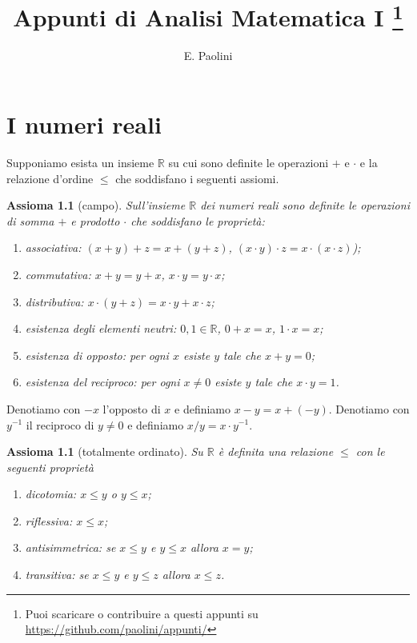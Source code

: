 \documentclass[italian,a4paper,oneside,headinclude]{scrbook}
\title{Appunti di Analisi Matematica I%
\thanks{%
Puoi scaricare o contribuire a questi appunti su
\url{https://github.com/paolini/appunti/}}}
\author{E. Paolini}
\newcommand{\RR}{\mathbb R}
\newtheorem{axiom}[theorem]{Assioma}
\begin{document}
\maketitle


\chapter{I numeri reali}

Supponiamo esista un insieme $\RR$ su cui sono definite le operazioni $+$ e $\cdot$
e la relazione d'ordine $\le$ che soddisfano i seguenti assiomi.

\begin{axiom}[campo]\label{axiom_field}
Sull'insieme $\RR$ dei numeri reali sono definite le operazioni di somma $+$ e
prodotto $\cdot$ che soddisfano le proprietà:
\begin{enumerate}
\item associativa: $(x+y)+z = x + (y+z)$, $(x\cdot y)\cdot z = x \cdot (x \cdot z)$);
\item commutativa: $x+y=y+x$, $x\cdot y = y \cdot x$;
\item distributiva: $x\cdot (y+z) = x\cdot y + x \cdot z$;
\item esistenza degli elementi neutri: $0,1\in \RR$, $0+x = x$, $1\cdot x = x$;
\item esistenza di opposto: per ogni $x$ esiste $y$ tale che $x+y = 0$;
\item esistenza del reciproco: per ogni $x\neq 0$ esiste $y$ tale che $x \cdot y = 1$.
\end{enumerate}
\end{axiom}

Denotiamo con $-x$ l'opposto di $x$ e definiamo $x-y = x+(-y)$.
Denotiamo con $y^{-1}$ il reciproco di $y\neq 0$ e
definiamo $x / y = x\cdot y^{-1}$.

\begin{axiom}[totalmente ordinato]\label{axiom_order}
Su $\RR$ è definita una relazione $\le$ con le seguenti proprietà
\begin{enumerate}
\item dicotomia: $x \le y$ o $y \le x$;
\item riflessiva: $x \le x$;
\item antisimmetrica: se $ x\le y$ e $y \le x$ allora $x=y$;
\item transitiva: se $x\le y $ e $ y \le z$ allora $x\le z$.
\end{enumerate}
\end{axiom}
\end{document}
